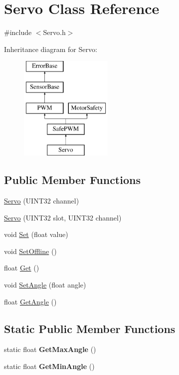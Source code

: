 \hypertarget{classServo}{\section{\-Servo \-Class \-Reference}
\label{classServo}
}


{\ttfamily \#include $<$\-Servo.\-h$>$}

\-Inheritance diagram for \-Servo\-:\begin{figure}[H]
\begin{center}
\leavevmode
\includegraphics[height=5.000000cm]{classServo}
\end{center}
\end{figure}
\subsection*{\-Public \-Member \-Functions}
\begin{DoxyCompactItemize}
\item 
\hyperlink{classServo_ac28728fe000cd4e1fbe37c7471c6ed42}{\-Servo} (\-U\-I\-N\-T32 channel)
\item 
\hyperlink{classServo_a0ec824dc7c4958c1386100b0e71419ee}{\-Servo} (\-U\-I\-N\-T32 slot, \-U\-I\-N\-T32 channel)
\item 
void \hyperlink{classServo_a9ab93d2e70c8be9d2599aa225a6f8610}{\-Set} (float value)
\item 
void \hyperlink{classServo_ab151adcbbabc49c1bbe41ec349f17c23}{\-Set\-Offline} ()
\item 
float \hyperlink{classServo_a5ecdde666455fa3c20d4ae1b6184a047}{\-Get} ()
\item 
void \hyperlink{classServo_a0046f9431e42de3fe63f8ce1b3995eb5}{\-Set\-Angle} (float angle)
\item 
float \hyperlink{classServo_a0ccee0191f0026d94db4646e6662700c}{\-Get\-Angle} ()
\end{DoxyCompactItemize}
\subsection*{\-Static \-Public \-Member \-Functions}
\begin{DoxyCompactItemize}
\item 
\hypertarget{classServo_ae36a37bed39b8f1eef52504835691c3a}{static float {\bfseries \-Get\-Max\-Angle} ()}\label{classServo_ae36a37bed39b8f1eef52504835691c3a}

\item 
\hypertarget{classServo_a5f278b3f0f6d99e4c3fd74ded31f8b93}{static float {\bfseries \-Get\-Min\-Angle} ()}\label{classServo_a5f278b3f0f6d99e4c3fd74ded31f8b93}

\end{DoxyCompactItemize}


